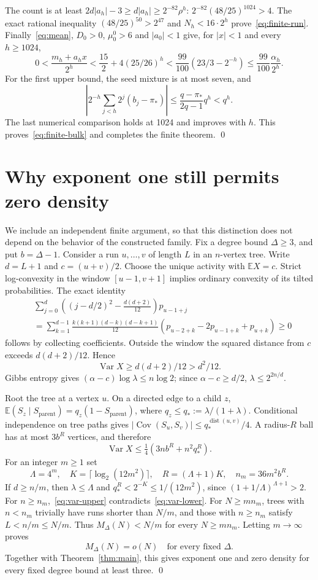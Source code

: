 \documentclass[11pt]{article}
\newcommand{\E}{\mathbb E}
\newcommand{\Var}{\operatorname{Var}}
\newcommand{\Cov}{\operatorname{Cov}}
\begin{document}
The count is at least $2d|a_h|-3\ge d|a_h|\ge2^{-82}\rho^h$:
$2^{-82}(48/25)^{1024}>4$. The exact rational inequality
$(48/25)^{50}>2^{47}$ and $N_h<16\cdot2^h$ prove~\eqref{eq:finite-run}.
Finally~\eqref{eq:mean}, $D_0>0$, $\mu_0^0>6$ and $|a_0|<1$ give,
for $|x|<1$ and every $h\ge1024$,
\[
 0<\frac{m_h+a_hx}{2^h}
 <\frac{15}{2}+4(25/26)^h
 <\frac{99}{100}(23/3-2^{-h})
 \le\frac{99}{100}\frac{\alpha_h}{2^h}.
\]
For the first upper bound, the seed mixture is at most seven, and
\[
 \left|2^{-h}\sum_{j<h}2^j(b_j-\pi_*)\right|
 \le\frac{q-\pi_*}{2q-1}q^h<q^h.
\]
The last numerical comparison holds at 1024 and improves with $h$.
This proves~\eqref{eq:finite-bulk} and completes the finite theorem.
\qed

\section{Why exponent one still permits zero density}\label{sec:upper}
We include an independent finite argument, so that this distinction
does not depend on the behavior of the constructed family.
Fix a degree bound $\Delta\ge3$, and put $b=\Delta-1$.
Consider a run $u,\ldots,v$ of length $L$ in an $n$-vertex tree.
Write $d=L+1$ and $c=(u+v)/2$. Choose the unique activity with
$\E X=c$. Strict log-convexity in the window $[u-1,v+1]$ implies
ordinary convexity of its tilted probabilities. The exact identity
\[
 \begin{split}
 &\sum_{j=0}^d\left((j-d/2)^2-\frac{d(d+2)}{12}\right)p_{u-1+j}\\
 &=\sum_{k=1}^{d-1}\frac{k(k+1)(d-k)(d-k+1)}{12}
       (p_{u-2+k}-2p_{u-1+k}+p_{u+k})\ge0
 \end{split}
\]
follows by collecting coefficients. Outside the window the squared
distance from $c$ exceeds $d(d+2)/12$. Hence
\begin{equation}\label{eq:var-lower}
 \Var X\ge d(d+2)/12>d^2/12.
\end{equation}
Gibbs entropy gives
$(\alpha-c)\log\lambda\le n\log2$; since $\alpha-c\ge d/2$,
$\lambda\le2^{2n/d}$.

Root the tree at a vertex $u$. On a directed edge to a child $z$,
$\E(S_z\mid S_{\mathrm{parent}})=q_z(1-S_{\mathrm{parent}})$,
where $q_z\le q_*:=\lambda/(1+\lambda)$.
Conditional independence on tree paths gives
$|\Cov(S_u,S_v)|\le q_*^{\operatorname{dist}(u,v)}/4$.
A radius-$R$ ball has at most $3b^R$ vertices, and therefore
\begin{equation}\label{eq:var-upper}
 \Var X\le\tfrac14(3nb^R+n^2q_*^R).
\end{equation}
For an integer $m\ge1$ set
\[
 \Lambda=4^m,\quad K=\lceil\log_2(12m^2)\rceil,\quad
 R=(\Lambda+1)K,\quad n_m=36m^2b^R.
\]
If $d\ge n/m$, then $\lambda\le\Lambda$ and
$q_*^R<2^{-K}\le1/(12m^2)$, since
$(1+1/\Lambda)^{\Lambda+1}>2$.
For $n\ge n_m$,~\eqref{eq:var-upper} contradicts~\eqref{eq:var-lower}.
For $N\ge mn_m$, trees with $n<n_m$ trivially have runs shorter than
$N/m$, and those with $n\ge n_m$ satisfy $L<n/m\le N/m$.
Thus $M_\Delta(N)<N/m$ for every $N\ge mn_m$.
Letting $m\to\infty$ proves
\[
 \boxed{M_\Delta(N)=o(N)\quad\text{for every fixed }\Delta.}
\]
Together with Theorem~\ref{thm:main}, this gives exponent one and
zero density for every fixed degree bound at least three. \qed
\end{document}
